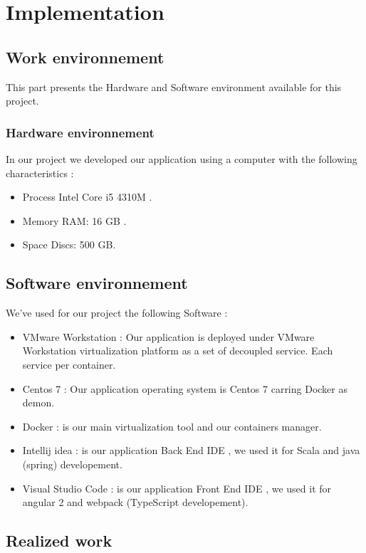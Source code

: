 %
%
\let\textcircled=\pgftextcircled
\chapter{Implementation}
\label{chap:intro}

\section{Work environnement}
\label{sec:sec01}
This part presents the Hardware and Software environment available for this project.
\subsection{Hardware environnement}
\label{sec:sec01}
In our project we developed our application using a computer with the following characteristics : 
\begin{itemize}
  \item Process Intel Core i5 4310M .
  \item Memory RAM: 16 GB .
  \item Space Discs: 500 GB.
\end{itemize}

\section{Software environnement}
\label{sec:sec01}
We've used for our project the following Software :
\begin{itemize}
  \item VMware Workstation : Our application is deployed under VMware Workstation virtualization
   platform as a set of decoupled service. Each service per container.
  \item Centos 7 : Our application operating system is Centos 7 carring Docker as demon. 
  \item Docker : is our main virtualization tool and our containers manager.
  \item Intellij idea : is our application Back End IDE , we used it for Scala and java (spring) developement.
  \item Visual Studio Code : is our application Front End IDE , we used it for angular 2 and webpack (TypeScript developement).
\end{itemize}
\section{Realized work}
\label{sec:sec01}
